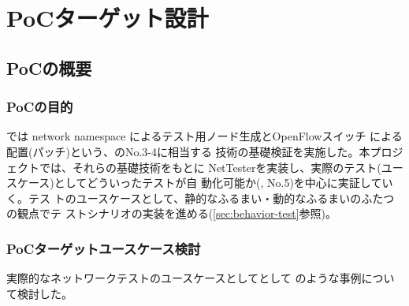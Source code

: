
\chapter{PoCターゲット設計}
\label{chap:poc-target-design}


 \section{PoCの概要}
 \label{sec:poc-overview}



 \subsection{PoCの目的}
 \label{sec:poc-purpose}

\lopjc では network namespace によるテスト用ノード生成とOpenFlowスイッチ
による配置(パッチ)という、のNo.3-4に相当する
技術の基礎検証を実施した。本プロジェクトでは、それらの基礎技術をもとに
NetTesterを実装し、実際のテスト(ユースケース)としてどういったテストが自
動化可能か(, No.5)を中心に実証していく。テス
トのユースケースとして、静的なふるまい・動的なふるまいのふたつの観点でテ
ストシナリオの実装を進める(\ref{sec:behavior-test}参照)。

  \subsection{PoCターゲットユースケース検討}
  \label{sec:poc-usecase-discuss}

実際的なネットワークテストのユースケースとしてとして
のような事例について検討した。

